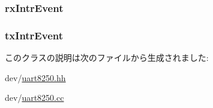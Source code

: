 \label{classUart8250_a87b7c2c55a7f4f90bfb8d7220e9ef4fd}
\hypertarget{classUart8250_a15bed45cc2f52bb7b1f571124937ef23}{
\subsubsection[{rxIntrEvent}]{ {\bf rxIntrEvent}}}
\label{classUart8250_a15bed45cc2f52bb7b1f571124937ef23}
\hypertarget{classUart8250_a619f722020680f8c7380685b753493b8}{
\subsubsection[{txIntrEvent}]{ {\bf txIntrEvent}}}
\label{classUart8250_a619f722020680f8c7380685b753493b8}


このクラスの説明は次のファイルから生成されました:\begin{DoxyCompactItemize}
\item 
dev/\hyperlink{uart8250_8hh}{uart8250.hh}\item 
dev/\hyperlink{uart8250_8cc}{uart8250.cc}\end{DoxyCompactItemize}
